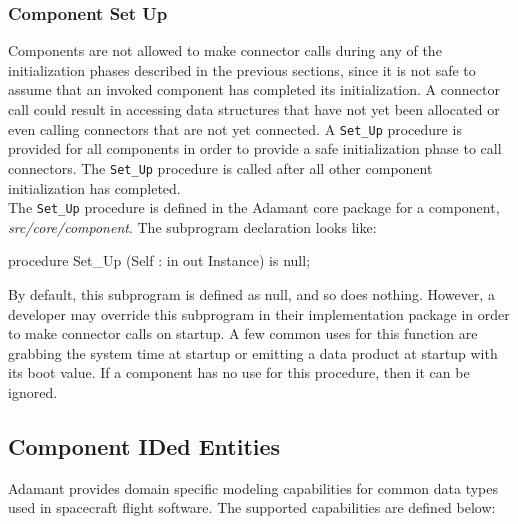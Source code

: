 \subsubsection{Component Set Up} \label{Component Set Up}

Components are not allowed to make connector calls during any of the initialization phases described in the previous sections, since it is not safe to assume that an invoked component has completed its initialization. A connector call could result in accessing data structures that have not yet been allocated or even calling connectors that are not yet connected. A \texttt{Set\_Up} procedure is provided for all components in order to provide a safe initialization phase to call connectors. The \texttt{Set\_Up} procedure is called after all other component initialization has completed. \\

The \texttt{Set\_Up} procedure is defined in the Adamant core package for a component, \textit{src/core/component}. The subprogram declaration looks like:

\vspace{5mm} %
\begin{adacode}
procedure Set_Up (Self : in out Instance) is null;
\end{adacode}
\vspace{5mm} %

By default, this subprogram is defined as null, and so does nothing. However, a developer may override this subprogram in their implementation package in order to make connector calls on startup. A few common uses for this function are grabbing the system time at startup or emitting a data product at startup with its boot value. If a component has no use for this procedure, then it can be ignored.

\subsection{Component IDed Entities} \label{Component IDed Entities}

Adamant provides domain specific modeling capabilities for common data types used in spacecraft flight software. The supported capabilities are defined below:

